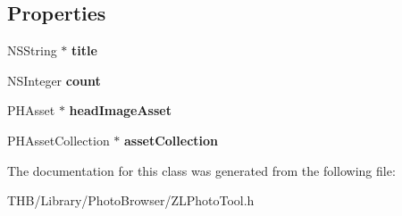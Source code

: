 \subsection*{Properties}
\begin{DoxyCompactItemize}
\item 
\mbox{\label{interface_z_l_photo_ablum_list_ad2189368509f477745818a22b4ebd40a}} 
N\+S\+String $\ast$ {\bfseries title}
\item 
\mbox{\label{interface_z_l_photo_ablum_list_ad0b111ebf91cb11977d0cfb10933181c}} 
N\+S\+Integer {\bfseries count}
\item 
\mbox{\label{interface_z_l_photo_ablum_list_a34c93177538b0b277367e88449376b68}} 
P\+H\+Asset $\ast$ {\bfseries head\+Image\+Asset}
\item 
\mbox{\label{interface_z_l_photo_ablum_list_aaf07a3c6612752785dfdd169ad87dd57}} 
P\+H\+Asset\+Collection $\ast$ {\bfseries asset\+Collection}
\end{DoxyCompactItemize}


The documentation for this class was generated from the following file\+:\begin{DoxyCompactItemize}
\item 
T\+H\+B/\+Library/\+Photo\+Browser/Z\+L\+Photo\+Tool.\+h\end{DoxyCompactItemize}
